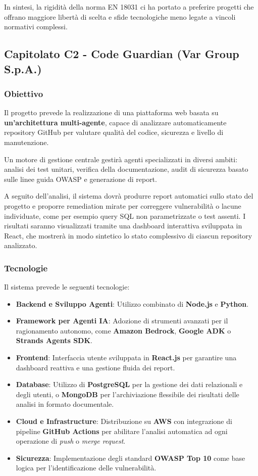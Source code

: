 \documentclass[a4paper, 10pt, colorlinks=true, linkcolor=black, urlcolor=blue, citecolor=blue, hidelinks]{article}
\begin{document}
In sintesi, la rigidità della norma EN 18031 ci ha portato a preferire progetti che offrano maggiore libertà di scelta e sfide tecnologiche meno legate a vincoli normativi complessi.

\subsection{Capitolato C2 - Code Guardian (Var Group S.p.A.)}

\subsubsection{Obiettivo}
Il progetto prevede la realizzazione di una piattaforma web basata su \textbf{un’architettura multi-agente}, capace di analizzare automaticamente repository GitHub per valutare qualità del codice, sicurezza e livello di manutenzione.

Un motore di gestione centrale gestirà agenti specializzati in diversi ambiti: analisi dei test unitari, verifica della documentazione, audit di sicurezza basato sulle linee guida OWASP e generazione di report.

A seguito dell’analisi, il sistema dovrà produrre report automatici sullo stato del progetto e proporre remediation mirate per correggere vulnerabilità o lacune individuate, come per esempio query SQL non parametrizzate o test assenti. I risultati saranno visualizzati tramite una dashboard interattiva sviluppata in React, che mostrerà in modo sintetico lo stato complessivo di ciascun repository analizzato.

\subsubsection{Tecnologie}
Il sistema prevede le seguenti tecnologie:
\begin{itemize}
    \item \textbf{Backend e Sviluppo Agenti}: Utilizzo combinato di \textbf{Node.js} e \textbf{Python}.
    \item \textbf{Framework per Agenti IA}: Adozione di strumenti avanzati per il ragionamento autonomo, come \textbf{Amazon Bedrock}, \textbf{Google ADK} o \textbf{Strands Agents SDK}.
    \item \textbf{Frontend}: Interfaccia utente sviluppata in \textbf{React.js} per garantire una dashboard reattiva e una gestione fluida dei report.
    \item \textbf{Database}: Utilizzo di \textbf{PostgreSQL} per la gestione dei dati relazionali e degli utenti, o \textbf{MongoDB} per l'archiviazione flessibile dei risultati delle analisi in formato documentale.
    \item \textbf{Cloud e Infrastructure}: Distribuzione su \textbf{AWS} con integrazione di pipeline \textbf{GitHub Actions} per abilitare l'analisi automatica ad ogni operazione di \textit{push} o \textit{merge request}.
    \item \textbf{Sicurezza}: Implementazione degli standard \textbf{OWASP Top 10} come base logica per l'identificazione delle vulnerabilità.
\end{itemize}
\end{document}
